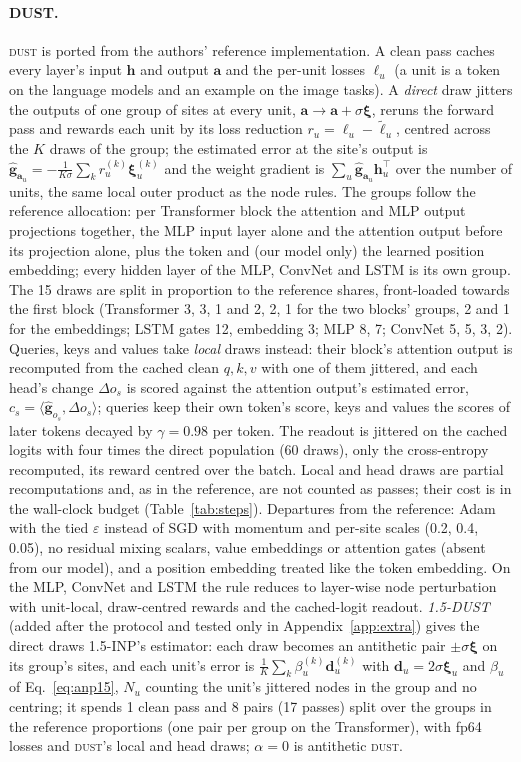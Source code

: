 \documentclass{article}
\newcommand{\method}[1]{\textsc{#1}}
\newcommand{\DUST}{\method{dust}}
\newcommand{\ghat}{\hat{\mathbf{g}}}
\newcommand{\bxi}{\boldsymbol{\xi}}
\newcommand{\bd}{\mathbf{d}}
\newcommand{\bh}{\mathbf{h}}
\newcommand{\ba}{\mathbf{a}}
\begin{document}
\paragraph{DUST.}
\DUST{} \citep{dahal2026dust} is ported from the authors' reference implementation. A
clean pass caches every layer's input $\bh$ and output $\ba$ and the per-unit losses
$\ell_u$ (a unit is a token on the language models and an example on the image tasks).
A \emph{direct} draw jitters the outputs of one group of sites at every unit,
$\ba\to\ba+\sigma\bxi$, reruns the forward pass and rewards each unit by its loss
reduction $r_u=\ell_u-\tilde\ell_u$, centred across the $K$ draws of the group; the
estimated error at the site's output is
$\ghat_{\ba_u}=-\frac{1}{K\sigma}\sum_k r_u^{(k)}\bxi_u^{(k)}$ and the weight gradient
is $\sum_u\ghat_{\ba_u}\bh_u^\top$ over the number of units, the same local outer product
as the node rules. The groups follow the reference allocation: per Transformer block the
attention and MLP output projections together, the MLP input layer alone and the
attention output before its projection alone, plus the token and (our model only) the
learned position embedding; every hidden layer of the MLP, ConvNet and LSTM is its own
group. The 15 draws are split in proportion to the reference shares, front-loaded towards
the first block (Transformer 3, 3, 1 and 2, 2, 1 for the two blocks' groups, 2 and 1 for
the embeddings; LSTM gates 12, embedding 3; MLP 8, 7; ConvNet 5, 5, 3, 2). Queries, keys
and values take \emph{local} draws instead: their block's attention output is recomputed
from the cached clean $q,k,v$ with one of them jittered, and each head's change
$\Delta o_s$ is scored against the attention output's estimated error,
$c_s=\langle\ghat_{o_s},\Delta o_s\rangle$; queries keep their own token's score, keys and
values the scores of later tokens decayed by $\gamma=0.98$ per token. The readout is
jittered on the cached logits with four times the direct population (60 draws), only the
cross-entropy recomputed, its reward centred over the batch. Local and head draws are
partial recomputations and, as in the reference, are not counted as passes; their cost is
in the wall-clock budget (Table~\ref{tab:steps}). Departures from the reference: Adam
with the tied $\varepsilon$ instead of SGD with momentum and per-site scales (0.2, 0.4,
0.05), no residual mixing scalars, value embeddings or attention gates (absent from our
model), and a position embedding treated like the token embedding. On the MLP, ConvNet
and LSTM the rule reduces to layer-wise node perturbation with unit-local, draw-centred
rewards and the cached-logit readout. \emph{1.5-DUST} (added after the protocol and
tested only in Appendix~\ref{app:extra}) gives the direct draws 1.5-INP's estimator: each
draw becomes an antithetic pair $\pm\sigma\bxi$ on its group's sites, and each unit's
error is $\frac{1}{K}\sum_k\beta_u^{(k)}\bd_u^{(k)}$ with $\bd_u=2\sigma\bxi_u$ and
$\beta_u$ of Eq.~\eqref{eq:anp15}, $N_u$ counting the unit's jittered nodes in the group
and no centring; it spends 1 clean pass and 8 pairs (17 passes) split over the groups in
the reference proportions (one pair per group on the Transformer), with fp64 losses and
\DUST{}'s local and head draws; $\alpha=0$ is antithetic \DUST{}.
\end{document}
